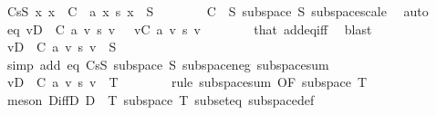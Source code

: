 \begin{isabellebody}
\ CsS{\isacharcolon}{\kern0pt}\ {\isachardoublequoteopen}{\isasymAnd}x{\isachardot}{\kern0pt}\ x\ {\isasymin}\ C\ {\isasymLongrightarrow}\ a\ x\ {\isacharasterisk}{\kern0pt}s\ x\ {\isasymin}\ S{\isachardoublequoteclose}\isanewline
\ \ \ \ \ \ \isamarkupfalse%
\ {\isacartoucheopen}C\ {\isasymsubseteq}\ S{\isacartoucheclose}\ {\isacartoucheopen}subspace\ S{\isacartoucheclose}\ subspace{\isacharunderscore}{\kern0pt}scale\ \isamarkupfalse%
\ auto\isanewline
\ \ \ \ \isamarkupfalse%
\ eq{\isacharcolon}{\kern0pt}\ {\isachardoublequoteopen}{\isacharparenleft}{\kern0pt}{\isasymSum}v{\isasymin}D\ {\isacharminus}{\kern0pt}\ C{\isachardot}{\kern0pt}\ a\ v\ {\isacharasterisk}{\kern0pt}s\ v{\isacharparenright}{\kern0pt}\ {\isacharequal}{\kern0pt}\ {\isacharminus}{\kern0pt}\ {\isacharparenleft}{\kern0pt}{\isasymSum}v{\isasymin}C{\isachardot}{\kern0pt}\ a\ v\ {\isacharasterisk}{\kern0pt}s\ v{\isacharparenright}{\kern0pt}{\isachardoublequoteclose}\isanewline
\ \ \ \ \ \ \isamarkupfalse%
\ that\ add{\isacharunderscore}{\kern0pt}eq{\isacharunderscore}{\kern0pt}{}{\isacharunderscore}{\kern0pt}iff\ \isamarkupfalse%
\ blast\isanewline
\ \ \ \ \isamarkupfalse%
\ {\isachardoublequoteopen}{\isacharparenleft}{\kern0pt}{\isasymSum}v{\isasymin}D\ {\isacharminus}{\kern0pt}\ C{\isachardot}{\kern0pt}\ a\ v\ {\isacharasterisk}{\kern0pt}s\ v{\isacharparenright}{\kern0pt}\ {\isasymin}\ S{\isachardoublequoteclose}\isanewline
\ \ \ \ \ \ \isamarkupfalse%
\ {\isacharparenleft}{\kern0pt}simp\ add{\isacharcolon}{\kern0pt}\ eq\ CsS\ {\isacartoucheopen}subspace\ S{\isacartoucheclose}\ subspace{\isacharunderscore}{\kern0pt}neg\ subspace{\isacharunderscore}{\kern0pt}sum{\isacharparenright}{\kern0pt}\isanewline
\ \ \ \ \isamarkupfalse%
\ \isamarkupfalse%
\ {\isachardoublequoteopen}{\isacharparenleft}{\kern0pt}{\isasymSum}v{\isasymin}D\ {\isacharminus}{\kern0pt}\ C{\isachardot}{\kern0pt}\ a\ v\ {\isacharasterisk}{\kern0pt}s\ v{\isacharparenright}{\kern0pt}\ {\isasymin}\ T{\isachardoublequoteclose}\isanewline
\ \ \ \ \ \ \isamarkupfalse%
\ {\isacharparenleft}{\kern0pt}rule\ subspace{\isacharunderscore}{\kern0pt}sum\ {\isacharbrackleft}{\kern0pt}OF\ {\isacartoucheopen}subspace\ T{\isacartoucheclose}{\isacharbrackright}{\kern0pt}{\isacharparenright}{\kern0pt}\isanewline
\ \ \ \ \ \ \isamarkupfalse%
\ {\isacharparenleft}{\kern0pt}meson\ DiffD{}\ {\isacartoucheopen}D\ {\isasymsubseteq}\ T{\isacartoucheclose}\ {\isacartoucheopen}subspace\ T{\isacartoucheclose}\ subset{\isacharunderscore}{\kern0pt}eq\ subspace{\isacharunderscore}{\kern0pt}def{\isacharparenright}{\kern0pt}\isanewline

\end{isabellebody}
